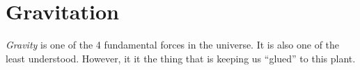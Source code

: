 \section{Gravitation} \label{sec:Gravitation}
\begin{definition}[Gravity] \label{def:Gravity}
  \emph{Gravity} is one of the 4 fundamental forces in the universe.
  It is also one of the least understood.
  However, it it the thing that is keeping us ``glued'' to this plant.
\end{definition}
